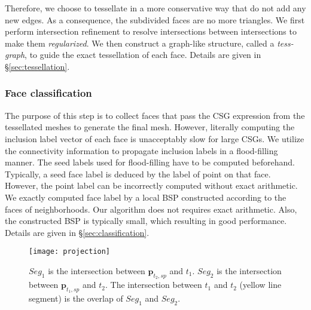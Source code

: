 Therefore, we choose to tessellate in a more conservative way that do not add any new edges. As a consequence, the subdivided faces are no more triangles. We first perform intersection refinement to resolve intersections between intersections to make them \emph{regularized}. We then construct a graph-like structure, called a \emph{tess-graph}, to guide the exact tessellation of each face. Details are given in \S\ref{sec:tessellation}.

\subsubsection{Face classification}

The purpose of this step is to collect faces that pass the CSG expression from the tessellated meshes to generate the final mesh. However, literally computing the inclusion label vector of each face is unacceptably slow for large CSGs. We utilize the connectivity information to propagate inclusion labels in a flood-filling manner. The seed labels used for flood-filling have to be computed beforehand. Typically, a seed face label is deduced by the label of point on that face. However, the point label can be incorrectly computed without exact arithmetic. We exactly computed face label by a local BSP constructed according to the faces of neighborhoods. Our algorithm does not requires exact arithmetic. Also, the constructed BSP is typically small, which resulting in good performance. Details are given in \S\ref{sec:classification}.


\begin{figure}[t]
\centering
\texttt{[image: projection]}
\caption{$Seg_1$ is the intersection between $\bm{p}_{t_2, sp}$ and $t_1$. $Seg_2$ is the intersection between $\bm{p}_{t_1, sp}$ and $t_2$. The intersection between $t_1$ and $t_2$ (yellow line segment) is the overlap of $Seg_1$ and $Seg_2$.}
\label{fig_projection}
\end{figure}
